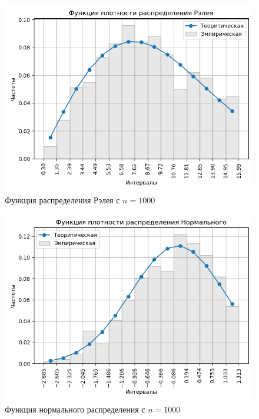 \documentclass[a4]{article}
\begin{document}
\begin{center}
\begin{figure}[H]
\caption{Функция распределения Рэлея с $ n = 1000$}
\includegraphics[width=\textwidth]{output/task2/rayleigh_1000_histogram.png}
\end{figure}

\begin{figure}[H]
\caption{Функция нормального распределения с $ n = 1000$}
\includegraphics[width=\textwidth]{output/task2/norm_1000_histogram.png}
\end{figure}


\end{center}
\end{document}
